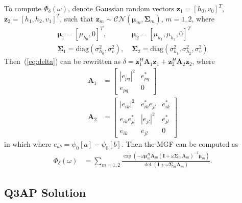 \documentclass[conference]{IEEEtran}
\begin{document}
To compute $\Phi_{\delta}(\omega)$, denote Gaussian random vectors $\mathbf{z}_1
= [h_0, v_0]^T$, $\mathbf{z}_{2} = [h_1, h_2, v_1]^T$, such
that $\mathbf{z}_m\sim\mathcal{CN}(\bm{\mu}_m, \mathbf{\Sigma}_m)$, $m=1,2$,
where
\begin{align}
    \bm{\mu}_1 = [\mu_{h_0}, 0]^T,& \; \bm{\mu}_{2} = [\mu_{h_1}, \mu_{h_2},
    0]^T
    \\
    \mathbf{\Sigma}_1 = \mbox{diag}\left(\sigma_{h_0}^2, \sigma_v^2\right), & \;
    \mathbf{\Sigma}_2 = \mbox{diag}\left(\sigma_{h_1}^2, \sigma_{h_2}^2,
    \sigma_v^2\right)
\end{align}
Then~(\ref{eq:delta}) can be rewritten as $\delta = \mathbf{z}_1^H\mathbf{A}_1\mathbf{z}_1 + \mathbf{z}_{2}^H\mathbf{A}_{2}\mathbf{z}_{2}$, where
\begin{subequations}
    \begin{align}
        \mathbf{A}_1 & = \left[
            \begin{array}{cc}
                |e_{pq}|^2  & e_{pq}^* \\
                e_{pq} & 0
            \end{array}
        \right] \\
        \mathbf{A}_2 & = \left[
            \begin{array}{ccc}
            |e_{ik}|^2 & e_{ik}^*e_{jl} & e_{ik}^*
            \\
            e_{ik}e_{jl}^* & |e_{jl}|^2 & e_{jl}^*
            \\
            e_{ik} & e_{jl} & 0
        \end{array}
        \right]
    \end{align}
\end{subequations}
in which where $e_{ab} = \psi_0[a] - \psi_0[b]$. Then the MGF can be computed
as~\cite{schwartz1995communication}
\begin{align}
    \Phi_{\delta}(\omega) & = \sum_{m=1,2}
    \frac{\exp(-\omega\bm{\mu}_m^H\mathbf{A}_m(\mathbf{I} +
    \omega\mathbf{\Sigma}_m\mathbf{A}_m)^{-1}\bm{\mu}_m)}{\det(\mathbf{I} +
    \omega\mathbf{\Sigma}_m\mathbf{A}_m)}.
\end{align}



\subsection{Q3AP Solution}
\end{document}
